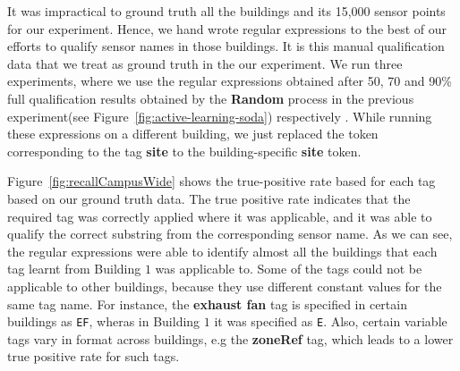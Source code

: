 It was impractical to ground truth all the buildings and its 15,000 sensor points for our experiment. Hence, we hand wrote regular expressions to the best of our efforts to qualify sensor names in those buildings. It is this manual qualification data that we treat as ground truth in the our experiment. We run three experiments, where we use the regular expressions obtained after 50, 70 and 90\% full qualification results obtained by the {\bf Random} process in the previous experiment(see Figure~\ref{fig:active-learning-soda}) respectively . While running these expressions on a different building, we just replaced the token corresponding to the tag {\bf site} to the building-specific {\bf site}  token. 

Figure~\ref{fig:recallCampusWide} shows the true-positive rate based for each tag based on our ground truth data. The true positive rate indicates that the required tag was correctly applied where it was applicable, and it was able to qualify the correct substring from the corresponding sensor name. As we can see, the regular expressions were able to identify almost all the buildings that each tag learnt from Building $1$ was applicable to. Some of the tags could not be applicable to other buildings, because they use different constant values for the same tag name. For instance, the {\bf exhaust fan} tag is specified in certain buildings as \texttt{EF}, wheras in Building $1$ it was specified as \texttt{E}. Also, certain variable tags vary in format across buildings, e.g the {\bf zoneRef} tag, which leads to a lower true positive rate for such tags. 

\FloatBarrier
%









